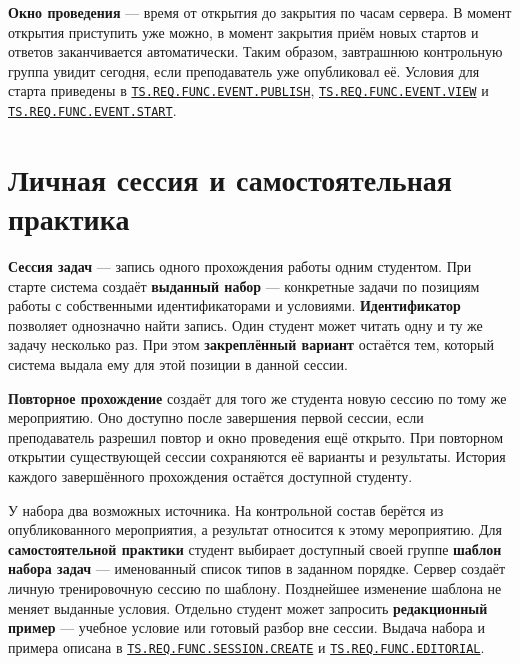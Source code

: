 \documentclass[12pt,a4paper]{article}
\begin{document}
\textbf{Окно проведения} --- время от открытия до закрытия по часам сервера. В момент открытия приступить уже можно, в момент закрытия приём новых стартов и ответов заканчивается автоматически. Таким образом, завтрашнюю контрольную группа увидит сегодня, если преподаватель уже опубликовал её. Условия для старта приведены в {\href{../../02\_Техническое\_задание/Техническое\_задание.pdf\#ts-req-func-event-publish}{\texttt{TS.\allowbreak{}REQ.\allowbreak{}FUNC.\allowbreak{}EVENT.\allowbreak{}PUBLISH}}}, {\href{../../02\_Техническое\_задание/Техническое\_задание.pdf\#ts-req-func-event-view}{\texttt{TS.\allowbreak{}REQ.\allowbreak{}FUNC.\allowbreak{}EVENT.\allowbreak{}VIEW}}} и {\href{../../02\_Техническое\_задание/Техническое\_задание.pdf\#ts-req-func-event-start}{\texttt{TS.\allowbreak{}REQ.\allowbreak{}FUNC.\allowbreak{}EVENT.\allowbreak{}START}}}.

\section{Личная сессия и самостоятельная практика}\label{ux43bux438ux447ux43dux430ux44f-ux441ux435ux441ux441ux438ux44f-ux438-ux441ux430ux43cux43eux441ux442ux43eux44fux442ux435ux43bux44cux43dux430ux44f-ux43fux440ux430ux43aux442ux438ux43aux430}

\hypertarget{личная-сессия-и-самостоятельная-практика}{}

\textbf{Сессия задач} --- запись одного прохождения работы одним студентом. При старте система создаёт \textbf{выданный набор} --- конкретные задачи по позициям работы с собственными идентификаторами и условиями. \textbf{Идентификатор} позволяет однозначно найти запись. Один студент может читать одну и ту же задачу несколько раз. При этом \textbf{закреплённый вариант} остаётся тем, который система выдала ему для этой позиции в данной сессии.

\textbf{Повторное прохождение} создаёт для того же студента новую сессию по тому же мероприятию. Оно доступно после завершения первой сессии, если преподаватель разрешил повтор и окно проведения ещё открыто. При повторном открытии существующей сессии сохраняются её варианты и результаты. История каждого завершённого прохождения остаётся доступной студенту.

У набора два возможных источника. На контрольной состав берётся из опубликованного мероприятия, а результат относится к этому мероприятию. Для \textbf{самостоятельной практики} студент выбирает доступный своей группе \textbf{шаблон набора задач} --- именованный список типов в заданном порядке. Сервер создаёт личную тренировочную сессию по шаблону. Позднейшее изменение шаблона не меняет выданные условия. Отдельно студент может запросить \textbf{редакционный пример} --- учебное условие или готовый разбор вне сессии. Выдача набора и примера описана в {\href{../../02\_Техническое\_задание/Техническое\_задание.pdf\#ts-req-func-session-create}{\texttt{TS.\allowbreak{}REQ.\allowbreak{}FUNC.\allowbreak{}SESSION.\allowbreak{}CREATE}}} и {\href{../../02\_Техническое\_задание/Техническое\_задание.pdf\#ts-req-func-editorial}{\texttt{TS.\allowbreak{}REQ.\allowbreak{}FUNC.\allowbreak{}EDITORIAL}}}.
\end{document}
